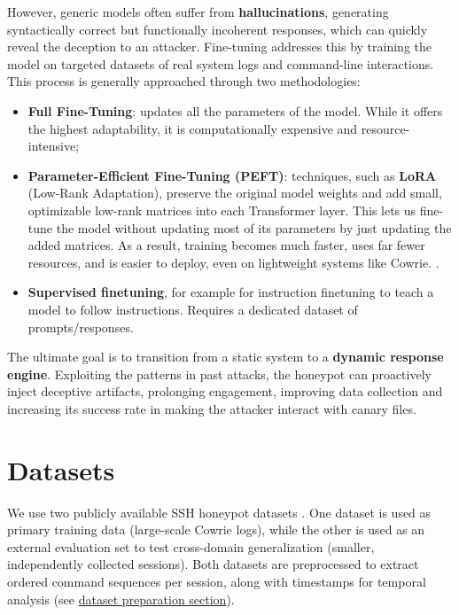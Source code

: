 \documentclass[10pt,a4paper,twocolumn]{article}
\begin{document}
However, generic models often suffer from \textbf{hallucinations}, generating syntactically correct but functionally incoherent responses, which can quickly reveal the deception to an attacker. Fine-tuning addresses this by training the model on targeted datasets of real system logs and command-line interactions. This process is generally approached through two methodologies:
\begin{itemize}
    \item \textbf{Full Fine-Tuning}: updates all the parameters of the model. While it offers the highest adaptability, it is computationally expensive and resource-intensive;
    \item \textbf{Parameter-Efficient Fine-Tuning (PEFT)}: techniques, such as \textbf{LoRA} (Low-Rank Adaptation), preserve the original model weights and add small, optimizable low-rank matrices into each Transformer layer. This lets us fine-tune the model without updating most of its parameters by just updating the added matrices. As a result, training becomes much faster, uses far fewer resources, and is easier to deploy, even on lightweight systems like Cowrie. \cite{LLMFineTuning}.
    \item \textbf{Supervised finetuning}, for example for instruction finetuning to teach a model to follow instructions. Requires a dedicated dataset of prompts/responses.
\end{itemize}
The ultimate goal is to transition from a static system to a \textbf{dynamic response engine}. Exploiting the patterns in past attacks, the honeypot can proactively inject deceptive artifacts, prolonging engagement, improving data collection and increasing its success rate in making the attacker interact with canary files. 

\section{Datasets}
\label{sec:datasets}
We use two publicly available SSH honeypot datasets \cite{CyberLab_JSON_DataSet,CowrieHoneypot_DataSet}. One dataset is used as primary training data (large-scale Cowrie logs), while the other is used as an external evaluation set to test cross-domain generalization (smaller, independently collected sessions). Both datasets are preprocessed to extract ordered command sequences per session, along with timestamps for temporal analysis (see \hyperref[sec:dataset-prep]{dataset preparation section}).
\end{document}
